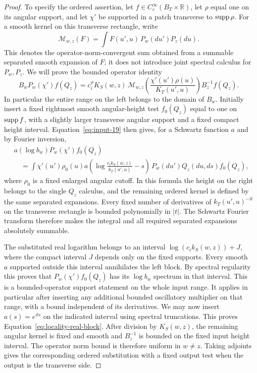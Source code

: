 \begin{proof}
To specify the ordered assertion, let $f\in C_c^\infty(B_T\times\mathbb R)$,
let $\rho$ equal one on its angular support, and let $\chi'$ be supported
in a patch transverse to $\operatorname{supp}\rho$. For a smooth kernel on this
transverse rectangle, write
\[
 \mathcal M_{w,z}(F)
   =\int F(u',u)\,P_w(du')P_z(du).
\]
This denotes the operator-norm-convergent sum obtained from a summable
separated smooth expansion of $F$; it does not introduce joint spectral
calculus for $P_w,P_z$. We will prove the bounded operator identity
\begin{equation}
 B_wP_w(\chi')f(Q_z)
 =c_i^\vartheta K_S(w,z)\,
   \mathcal M_{w,z}\!\left(
        \frac{\chi'(u')\rho(u)}{K_T(u',u)}\right)
   B_z^{-1}f(Q_z).
 \label{eq:locality-real-block}
\end{equation}
In particular the entire range on the left belongs to the domain of
$B_w$. Initially insert a fixed rightmost smooth angular-height test
$f_0(Q_z)$ equal to one on $\operatorname{supp} f$, with a slightly larger transverse
angular support and a fixed compact height interval. Equation~\eqref{eq:input-19}
then gives, for a Schwartz function $a$ and by Fourier inversion,
\[
 \begin{aligned}
 &a(\log b_w)P_w(\chi')f_0(Q_z)\\
 &\quad=\int \chi'(u')\rho_0(u)
 a\!\left(\log\frac{c_i k_S(w,z)}{k_T(u',u)}-s\right)
 \,P_w(du')Q_z(du,ds)f_0(Q_z),
 \end{aligned}
\]
where $\rho_0$ is a fixed enlarged angular cutoff. In this formula the
height on the right belongs to the single $Q_z$ calculus, and the
remaining ordered kernel is defined by the same separated expansions.
Every fixed number of derivatives of $k_T(u',u)^{-\mathrm it}$ on the
transverse rectangle is bounded polynomially in $|t|$. The Schwartz
Fourier transform therefore makes the integral and all required
separated expansions absolutely summable.

The substituted real logarithm belongs to an interval
$\log(c_i k_S(w,z))+J$, where the compact interval $J$ depends only on
the fixed supports. Every smooth $a$ supported outside this interval
annihilates the left block. By spectral regularity this proves that
$P_w(\chi')f_0(Q_z)$ has its $\log b_w$ spectrum in that interval.
This is a bounded-operator support statement on the whole input range.
It applies in particular after inserting any additional bounded
oscillatory multiplier on that range, with a bound independent of its
derivatives. We may now insert $a(s)=e^{\vartheta s}$ on the indicated
interval using spectral truncations. This proves
Equation~\eqref{eq:locality-real-block}. After division by $K_S(w,z)$,
the remaining angular kernel is fixed and smooth and $B_z^{-1}$ is
bounded on the fixed input height interval. The operator norm bound is
therefore uniform in $w\ne z$. Taking adjoints gives the corresponding
ordered substitution with a fixed output test when the output is the
transverse side.
\end{proof}

